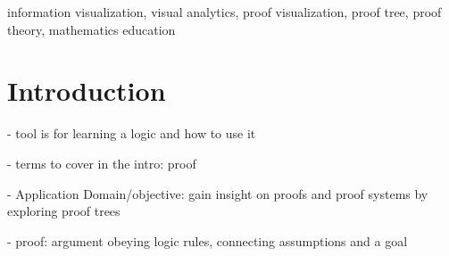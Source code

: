 \documentclass[conference]{IEEEtran}
\begin{document}
\newcommand{\sentencefive}{The proof visualization tool allows either open exploration of a proof or a directed walk-through, revealing supplementary information to serve as a form of discourse as the nodes are visited.}


\newcommand{\sentencesix}{This work provides a tool for gaining understanding of the structure of proofs, insight into the processes used in constructing such proofs, and also serves as a starting point for visualizations of proof trees in more complicated logics.}




\begin{abstract}
    \sentenceone{} \sentencetwo{} \sentencethree{} \sentencefour{} \sentencefive{} \sentencesix{}
\end{abstract}


\begin{IEEEkeywords}
    information visualization, visual analytics, proof visualization, proof tree, proof theory, mathematics education
\end{IEEEkeywords}


\section{Introduction}


- tool is for learning a logic and how to use it

- terms to cover in the intro: proof

- Application Domain/objective: gain insight on proofs and proof systems by exploring proof trees

- proof: argument obeying logic rules, connecting assumptions and a goal
\end{document}
